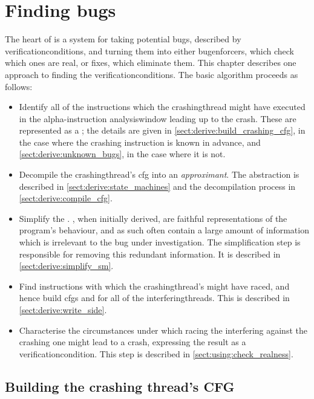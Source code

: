 \chapter{Finding bugs}
\label{sect:derive}

The heart of {\technique} is a system for taking potential bugs,
described by \glspl{verificationcondition}, and turning them into
either \glspl{bugenforcer}, which check which ones are real, or fixes,
which eliminate them.  This chapter describes one approach to finding
the \glspl{verificationcondition}.  The basic algorithm proceeds as
follows:
\begin{itemize}
\item Identify all of the instructions which the \gls{crashingthread}
  might have executed in the \gls{alpha}-instruction
  \gls{analysiswindow} leading up to the crash.  These are represented
  as a ; the details are given
  in \autoref{sect:derive:build_crashing_cfg}, in the case where the
  crashing instruction is known in advance, and
  \autoref{sect:derive:unknown_bugs}, in the case where it is not.
\item Decompile the \gls{crashingthread}'s \gls{cfg} into an
  \emph{approximant}.  The {\StateMachine} abstraction is described in
  \autoref{sect:derive:state_machines} and the decompilation process
  in \autoref{sect:derive:compile_cfg}.
\item Simplify the {\StateMachine}.  {\STateMachines}, when initially
  derived, are faithful representations of the program's behaviour,
  and as such often contain a large amount of information which is
  irrelevant to the bug under investigation.  The simplification step
  is responsible for removing this redundant information.  It is
  described in \autoref{sect:derive:simplify_sm}.
\item Find instructions with which the \gls{crashingthread}'s
  {\StateMachine} might have raced, and hence build \glspl{cfg} and
  {\StateMachines} for all of the \glspl{interferingthread}.  This is
  described in \autoref{sect:derive:write_side}.
\item Characterise the circumstances under which racing the
  interfering {\StateMachines} against the crashing one might lead to
  a crash, expressing the result as a \gls{verificationcondition}.
  This step is described in \autoref{sect:using:check_realness}.
\end{itemize}

\section{Building the crashing thread's CFG}
\label{sect:derive:build_crashing_cfg}

